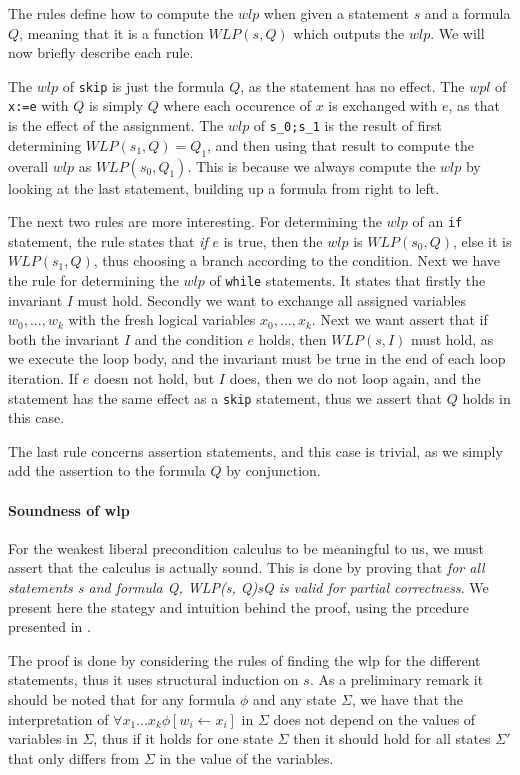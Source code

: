 The rules define how to compute the $wlp$ when given a statement $s$ and a formula $Q$, meaning that it is a function $WLP(s,Q)$ which outputs the $wlp$.
We will now briefly describe each rule.

The $wlp$ of \texttt{skip} is just the formula $Q$, as the statement has no effect.
The $wpl$ of \texttt{x:=e} with $Q$ is simply $Q$ where each occurence of $x$ is exchanged with $e$, as that is the effect of the assignment.
The $wlp$ of \texttt{s_0;s_1} is the result of first determining $WLP(s_{1},Q) = Q_{1}$, and then using that result to compute the overall $wlp$ as $WLP(s_{0}, Q_{1})$. This is because we always compute the $wlp$ by looking at the last statement, building up a formula from right to left.

The next two rules are more interesting.
For determining the $wlp$ of an \texttt{if} statement, the rule states that \textit{if} $e$ is true, then the $wlp$ is $WLP(s_{0}, Q)$, else it is $WLP(s_{1},Q)$, thus choosing a branch according to the condition.
Next we have the rule for determining the $wlp$ of \texttt{while} statements.
It states that firstly the invariant $I$ must hold. Secondly we want to exchange all assigned variables $w_{0},...,w_{k}$ with the fresh logical variables $x_{0},...,x_{k}$. Next we want assert that if both the invariant $I$ and the condition $e$ holds, then $WLP(s, I)$ must hold, as we execute the loop body, and the invariant must be true in the end of each loop iteration. If $e$ doesn not hold, but $I$ does, then we do not loop again, and the statement has the same effect as a \texttt{skip} statement, thus we assert that $Q$ holds in this case.

The last rule concerns assertion statements, and this case is trivial, as we simply add the assertion to the formula $Q$ by conjunction.

\paragraph{Soundness of wlp}
For the weakest liberal precondition calculus to be meaningful to us, we must assert that the calculus is actually sound.
This is done by proving that \textit{for all statements s and formula Q, {WLP(s, Q)}s{Q} is valid for partial correctness}.
We present here the stategy and intuition behind the proof, using the prcedure presented in \cite{wlp}.

The proof is done by considering the rules of finding the wlp for the different statements, thus it uses structural induction on $s$.
As a preliminary remark it should be noted that for any formula $\phi$ and any state $\Sigma$, we have that the interpretation of $\forall x_{1} ... x_{k} \phi [w_{i} \leftarrow x_{i}]$ in $\Sigma$ does not depend on the values of variables in $\Sigma$, thus if it holds for one state $\Sigma$ then it should hold for all states $\Sigma'$ that only differs from $\Sigma$ in the value of the variables.


